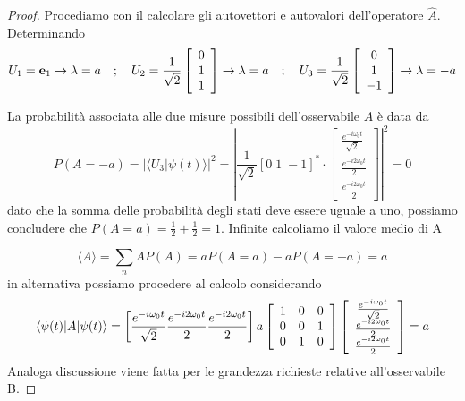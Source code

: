 \begin{proof}
Procediamo con il calcolare gli autovettori e autovalori dell'operatore $\hat{A}$. Determinando
\begin{equation*}
	U_1 = \bold{e}_{1} \rightarrow \lambda = a \quad ; \quad U_2 = \frac{1}{\sqrt{2}}\left [ \begin{array}{c}
			0 \\ 1 \\ 1
		\end{array}\right]  \rightarrow \lambda = a \quad ; \quad U_3 = \frac{1}{\sqrt{2}}\left [ \begin{array}{c}
			0 \\ 1 \\ -1 
		\end{array}\right]\rightarrow \lambda = -a 
\end{equation*}

La probabilit\`a associata alle due misure possibili dell'osservabile $A$ \`e data da 
\begin{equation*}
	P(A = -a) = |\langle U_3 | \psi(t) \rangle |^2 = \left |\frac{1}{\sqrt{2}} [0 \; 1 \; -1]^* \cdot \left [ \begin{array}{c}
		\frac{e^{-i \omega_0t}}{\sqrt{2}} \\ \frac{e^{-i2 \omega_0 t}}{2} \\ \frac{e^{-i2 \omega_0 t}}{2}
	\end{array}\right] \right|^2 = 0
\end{equation*}	
dato che la somma delle probabilit\`a degli stati deve essere uguale a uno, possiamo concludere che $P(A = a) =\frac{1}{2} + \frac{1}{2} = 1$.
Infinite calcoliamo il valore medio di A
\newpage

\begin{equation*}
	\langle A \rangle = \sum_{n}AP(A) = aP(A=a)-aP(A =-a) =a
\end{equation*}
in alternativa possiamo procedere al calcolo considerando
\begin{equation*}
	\langle \psi(t)|A|\psi(t) \rangle = \left [ \frac{e^{-i \omega_0t}}{\sqrt{2}} \\ \frac{e^{-i2 \omega_0 t}}{2} \\ \frac{e^{-i2 \omega_0 t}}{2}\right] a \left [ \begin{array}{ccc}
		1 & 0 & 0\\
		0 & 0 & 1 \\
		0 & 1 & 0
	\end{array}\right] \left [ \begin{array}{c}
		\frac{e^{-i \omega_0t}}{\sqrt{2}} \\ \frac{e^{-i2 \omega_0 t}}{2} \\ \frac{e^{-i2 \omega_0 t}}{2}
	\end{array}\right] = a
\end{equation*}
Analoga discussione viene fatta per le grandezza richieste relative all'osservabile B.

\end{proof}

